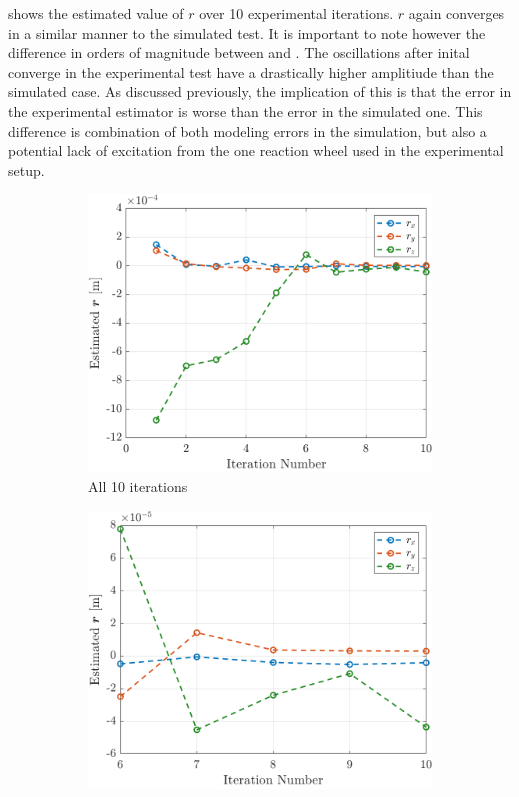  shows the estimated value of $r$ over 10 experimental iterations. $r$ again converges in a similar manner to the simulated test. It is important to note however the difference in orders of magnitude between  and . The oscillations after inital converge in the experimental test have a drastically higher amplitiude than the simulated case. As discussed previously, the implication of this is that the error in the experimental estimator is worse than the error in the simulated one. This difference is combination of both modeling errors in the simulation, but also a potential lack of excitation from the one reaction wheel used in the experimental setup. 


\begin{figure}[ht]
  \centering
  \begin{subfigure}[t]{0.47\textwidth}
    \includegraphics[width=\linewidth]{plots/LSR_hardware_all_runs.png}
    \caption{All 10 iterations}\label{fig:LSR_hardware_runs_a}
  \end{subfigure}\hfill
  \begin{subfigure}[t]{0.47\textwidth}
    \includegraphics[width=\linewidth]{plots/LSR_hardware_last_5_runs.png}

\end{subfigure}
\end{figure}
